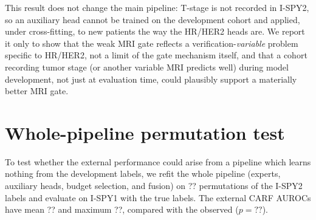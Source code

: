 \documentclass[a4paper,runningheads]{llncs}
\providecommand{\PermMaxCarf}{??}\providecommand{\NPerm}{??}\providecommand{\PermPCarf}{??}\providecommand{\PermMeanCarf}{??}
\begin{document}
This result does not change the main pipeline: T-stage is not recorded in I-SPY2, so an auxiliary head cannot be trained on the development cohort and applied, under cross-fitting, to new patients the way the HR/HER2 heads are. We report it only to show that the weak MRI gate reflects a verification-\emph{variable} problem specific to HR/HER2, not a limit of the gate mechanism itself, and that a cohort recording tumor stage (or another variable MRI predicts well) during model development, not just at evaluation time, could plausibly support a materially better MRI gate.

\section{Whole-pipeline permutation test}

To test whether the external performance could arise from a pipeline which learns nothing from the development labels, we refit the whole pipeline (experts, auxiliary heads, budget selection, and fusion) on \NPerm{} permutations of the I-SPY2 labels and evaluate on I-SPY1 with the true labels. The external CARF AUROCs have mean \PermMeanCarf{} and maximum \PermMaxCarf{}, compared with the observed \ExtCarfTwo{} ($p=\PermPCarf$).



\end{document}
